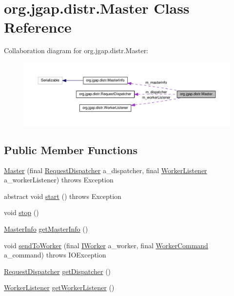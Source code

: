 \hypertarget{classorg_1_1jgap_1_1distr_1_1_master}{\section{org.\-jgap.\-distr.\-Master Class Reference}
\label{classorg_1_1jgap_1_1distr_1_1_master}
}


Collaboration diagram for org.\-jgap.\-distr.\-Master\-:
\nopagebreak
\begin{figure}[H]
\begin{center}
\leavevmode
\includegraphics[width=350pt]{classorg_1_1jgap_1_1distr_1_1_master__coll__graph}
\end{center}
\end{figure}
\subsection*{Public Member Functions}
\begin{DoxyCompactItemize}
\item 
\hyperlink{classorg_1_1jgap_1_1distr_1_1_master_adda3e36b2c04703a00573af5bc98b92d}{Master} (final \hyperlink{classorg_1_1jgap_1_1distr_1_1_request_dispatcher}{Request\-Dispatcher} a\-\_\-dispatcher, final \hyperlink{classorg_1_1jgap_1_1distr_1_1_worker_listener}{Worker\-Listener} a\-\_\-worker\-Listener)  throws Exception 
\item 
abstract void \hyperlink{classorg_1_1jgap_1_1distr_1_1_master_a3d5f4f1fd5bb8a401fddaee0eaf93257}{start} ()  throws Exception
\item 
void \hyperlink{classorg_1_1jgap_1_1distr_1_1_master_aec0e9db5db3316ec9ee903c3892f5796}{stop} ()
\item 
\hyperlink{classorg_1_1jgap_1_1distr_1_1_master_info}{Master\-Info} \hyperlink{classorg_1_1jgap_1_1distr_1_1_master_af16a6c54c5d237799899ceac5beba74f}{get\-Master\-Info} ()
\item 
void \hyperlink{classorg_1_1jgap_1_1distr_1_1_master_aef7c64089218808c9b7f0893e31fffbe}{send\-To\-Worker} (final \hyperlink{interfaceorg_1_1jgap_1_1distr_1_1_i_worker}{I\-Worker} a\-\_\-worker, final \hyperlink{classorg_1_1jgap_1_1distr_1_1_worker_command}{Worker\-Command} a\-\_\-command)  throws I\-O\-Exception 
\item 
\hyperlink{classorg_1_1jgap_1_1distr_1_1_request_dispatcher}{Request\-Dispatcher} \hyperlink{classorg_1_1jgap_1_1distr_1_1_master_ad5a2cf02fe02f1eb41516962bd897a59}{get\-Dispatcher} ()
\item 
\hyperlink{classorg_1_1jgap_1_1distr_1_1_worker_listener}{Worker\-Listener} \hyperlink{classorg_1_1jgap_1_1distr_1_1_master_ad818c93c8abe8525d4c8de808451f630}{get\-Worker\-Listener} ()
\end{DoxyCompactItemize}
